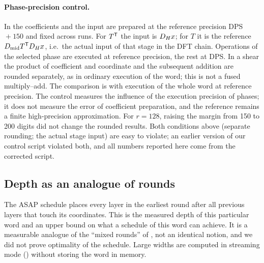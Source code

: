 \documentclass[11pt]{article}
\theoremstyle{plain}
\begin{document}
\paragraph{Phase-precision control.}
In  the coefficients and the input are prepared at the reference precision DPS${}+150$ and fixed across runs. For $T^{\mathsf{T}}$ the input is $D_H x$; for $T$ it is the reference $D_{\mathrm{mid}} T^{\mathsf{T}}D_H x$, i.e.\ the actual input of that stage in the DFT chain. Operations of the selected phase are executed at reference precision, the rest at DPS. In a shear the product of coefficient and coordinate and the subsequent addition are rounded separately, as in ordinary execution of the word; this is not a fused multiply--add. The comparison is with execution of the whole word at reference precision. The control measures the influence of the execution precision of phases; it does not measure the error of coefficient preparation, and the reference remains a finite high-precision approximation. For $r=128$, raising the margin from 150 to 200 digits did not change the rounded results. Both conditions above (separate rounding; the actual stage input) are easy to violate; an earlier version of our control script violated both, and all numbers reported here come from the corrected script.

\subsection{Depth as an analogue of rounds}\label{sec:asap}
The ASAP schedule places every layer in the earliest round after all previous layers that touch its coordinates. This is the measured depth of this particular word and an upper bound on what a schedule of this word can achieve. It is a measurable analogue of the ``mixed rounds'' of , not an identical notion, and we did not prove optimality of the schedule. Large widths are computed in streaming mode () without storing the word in memory.
\end{document}
